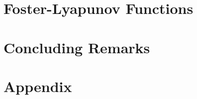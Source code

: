 \documentclass[ twoside,openright,titlepage,numbers=noenddot,%
                headinclude,footinclude,cleardoublepage=empty,abstract=on,
                BCOR=5mm,paper=b5,fontsize=11pt,
		dvipsnames
                ]{scrbook}
\begin{document}
\part{Foster-Lyapunov Functions}
\cleardoublepage
\part{Concluding Remarks}
\cleardoublepage
\appendix
\part{Appendix}

\backmatter
\cleardoublepage
\cleardoublepage
\cleardoublepage
\cleardoublepage
\end{document}
